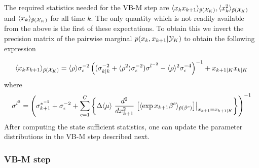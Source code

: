 \documentclass[12pt]{article}
\begin{document}
The required statistics needed for the VB-M step are $\langle x_kx_{k+1} \rangle_{\tilde{p}(\mathcal{X}_K)},
\langle x_k^2 \rangle_{\tilde{p}(\mathcal{X}_K)}$ and $\langle x_k \rangle_{\tilde{p}(\mathcal{X}_K)}$ for all time $k$. The only
quantity which is not readily available from the above is the first of these expectations. To obtain
this we invert the precision matrix of the pairwise marginal $p(x_k,x_{k+1}|\mathcal{Y}_K)$ to obtain the following expression

\begin{equation} \langle x_kx_{k+1} \rangle_{\tilde{p}(\mathcal{X}_K)} = \langle \rho \rangle \sigma^{-2}_\epsilon\left((\sigma^{-2}_{k|k} + \langle \rho^2 \rangle \sigma^{-2}_\epsilon)\sigma^{l^{-2}} - \langle \rho \rangle^2 \sigma_\epsilon^{-4} \right)^{-1}+ x_{k+1|K}x_{k|K}
\end{equation}
\noindent where \begin{equation} \sigma^{l^{2}} = \left(\sigma^{*^{-2}}_{k+1} +
	\sigma^{-2}_\epsilon + \sum_{c=1}^C \left\{\Delta \langle \mu \rangle \
	\frac{d^2}{dx_{k+1}^2}\left.\left[\langle \exp{x_{k+1}\beta^c}
	\rangle_{\tilde{p}(\beta^c)}\right]\right|_{x_{k+1} = x_{k+1|K}} \right\} \right)^{-1}
\end{equation} After computing the state sufficient statistics, one can update the parameter
distributions in the VB-M step described next.

\subsubsection{VB-M step}\label{sec:VBM}
\end{document}
